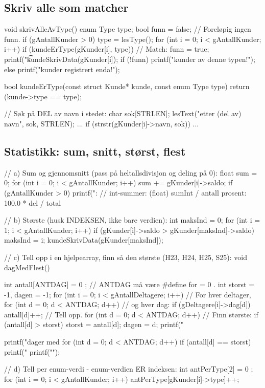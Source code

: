 \subsection{Skriv alle som matcher}\label{sec:match}
\begin{kode}
void skrivAlleAvType()  {
  enum Type type;
  bool funn = false;                               //  Foreløpig ingen funn.
  if (gAntallKunder > 0)  {
     type = lesType();
     for (int i = 0;  i < gAntallKunder;  i++)
         if (kundeErType(gKunder[i], type))  {     //  Match:
            funn = true;
            printf("\t%
            kundeSkrivData(gKunder[i]);
         }
     if (!funn)  printf("\n\tIngen kunder av denne typen!\n");
  } else
     printf("\n\tIngen kunder registrert enda!\n");
}

bool kundeErType(const struct Kunde* kunde, const enum Type type)  {
  return (kunde->type == type);
}

//  Søk på DEL av navn i stedet:
char sok[STRLEN];
lesText("\tSok etter (del av) navn", sok, STRLEN);
... if (strstr(gKunder[i]->navn, sok))  { ... }
\end{kode}

\subsection{Statistikk: sum, snitt, størst, flest}\label{sec:statistikk}
\begin{kode}
//  a) Sum og gjennomsnitt  (pass på heltallsdivisjon og deling på 0):
float sum = 0;
for (int i = 0;  i < gAntallKunder;  i++)  sum += gKunder[i]->saldo;
if (gAntallKunder > 0)  printf("\tSnitt: %
//    int-summer:  (float) sumInt / antall          prosent:  100.0 * del / total

//  b) Største (husk INDEKSEN, ikke bare verdien):
int maksInd = 0;
for (int i = 1;  i < gAntallKunder;  i++)
    if (gKunder[i]->saldo > gKunder[maksInd]->saldo)  maksInd = i;
kundeSkrivData(gKunder[maksInd]);

//  c) Tell opp i en hjelpearray, finn så den største (H23, H24, H25, S25):
void dagMedFlest()  {
  int antall[ANTDAG] = { 0 };            //  ANTDAG må være #define for = { 0 }.
  int storst = -1, dagen = -1;
  for (int i = 0;  i < gAntallDeltagere;  i++)     //  For hver deltager,
      for (int d = 0;  d < ANTDAG;  d++)           //    og hver dag:
          if (gDeltagere[i]->dag[d])  antall[d]++; //  Tell opp.
  for (int d = 0;  d < ANTDAG;  d++)               //  Finn største:
      if (antall[d] > storst)  {  storst = antall[d];  dagen = d;  }
  printf("\tDag %

  printf("\tAlle dager med %
  for (int d = 0;  d < ANTDAG;  d++)
      if (antall[d] == storst)  printf("  %
  printf("\n");
}

//  d) Tell per enum-verdi - enum-verdien ER indeksen:
int antPerType[2] = { 0 };
for (int i = 0;  i < gAntallKunder;  i++)  antPerType[gKunder[i]->type]++;
\end{kode}

